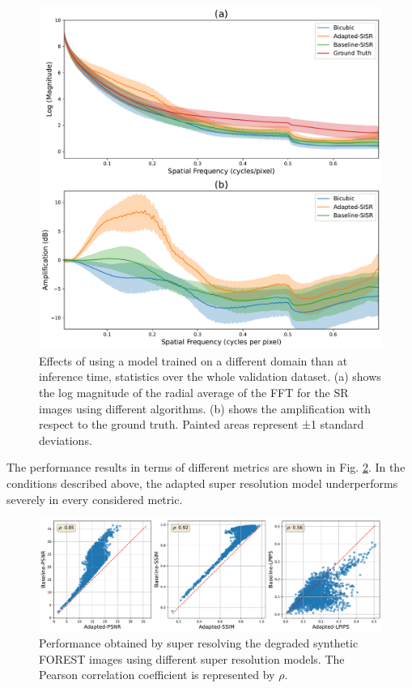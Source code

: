         \begin{figure}[H]
            \centering
            \includegraphics[scale=0.4]{Includes/5-target-amplification-statistics-with-domain-gap.pdf}
            \caption{Effects of using a model trained on a different domain than at inference time, statistics over the whole validation dataset. 
                     (a) shows the log magnitude of the radial average of the FFT for the SR images using different algorithms.
                     (b) shows the amplification with respect to the ground truth.
                     Painted areas represent ±1 standard deviations.
                     }
            \label{fig:5-target-amplification-statistics-with-domain-gap}
        \end{figure}

        The performance results in terms of different metrics are shown in Fig. \ref{fig:5-target-prediction-with-domain-gap-dataset}. 
        In the conditions described above, the adapted super resolution model underperforms severely in every considered metric.


        \begin{figure}[H]
            \centering
            \includegraphics[scale=0.38]{Includes/5-target-prediction-with-domain-gap-dataset.pdf}
            \caption{Performance obtained by super resolving the degraded synthetic FOREST images using different super resolution models. The Pearson correlation coefficient is represented by $\rho$.}
            \label{fig:5-target-prediction-with-domain-gap-dataset}
        \end{figure}


